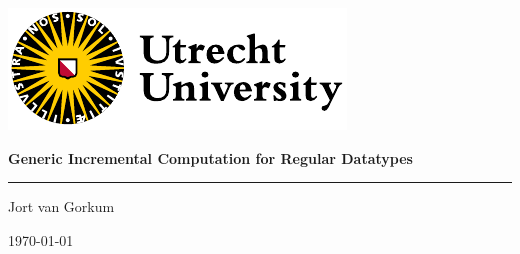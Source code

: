 \begin{frame}
\includegraphics[height=.7cm]{images/UU_logo_2021_EN_RGB.pdf}%
\vspace*{\fill}

\large \textbf{Generic Incremental Computation for Regular Datatypes}

\textcolor{yelloworange}{\rule{\textwidth}{0.4mm}}

\vspace*{0.5cm}

Jort van Gorkum

\vspace*{0.3cm}

\small \today
\end{frame}